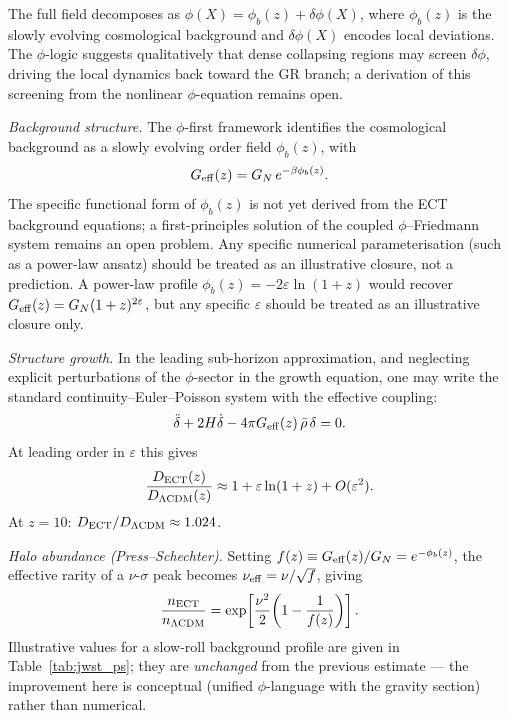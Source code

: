 \documentclass[11pt,a4paper]{article}
\numberwithin{equation}{section}
\begin{document}
The full field decomposes as $\phi(X)=\phi_b(z)+\delta\phi(X)$,
where $\phi_b(z)$ is the slowly evolving cosmological background
and $\delta\phi(X)$ encodes local deviations.
The $\phi$-logic suggests qualitatively that dense collapsing
regions may screen $\delta\phi$, driving the local dynamics back
toward the GR branch; a derivation of this screening from the
nonlinear $\phi$-equation remains open.

\textit{Background structure.}
The $\phi$-first framework identifies the cosmological background
as a slowly evolving order field $\phi_b(z)$, with
\begin{equation}
  G_{\rm eff}(z) = G_N\,e^{-\beta\phi_b(z)}.
  \label{eq:phi_b_ansatz}
\end{equation}
The specific functional form of $\phi_b(z)$ is not yet derived
from the ECT background equations; a first-principles solution
of the coupled $\phi$--Friedmann system remains an open problem.
Any specific numerical parameterisation (such as a power-law ansatz)
should be treated as an illustrative closure, not a prediction.
A power-law profile $\phi_b(z)=-2\varepsilon\ln(1+z)$ would recover
$G_{\rm eff}(z)=G_N(1+z)^{2\varepsilon}$, but any specific $\varepsilon$
should be treated as an illustrative closure only.

\textit{Structure growth.}
In the leading sub-horizon approximation, and neglecting explicit
perturbations of the $\phi$-sector in the growth equation, one may
write the standard continuity--Euler--Poisson system with the
effective coupling:
\begin{equation}
  \ddot\delta + 2H\dot\delta
  - 4\pi G_{\rm eff}(z)\,\bar\rho\,\delta = 0.
\end{equation}
At leading order in $\varepsilon$ this gives
\begin{equation}
  \frac{D_{\rm ECT}(z)}{D_{\Lambda{\rm CDM}}(z)}
  \approx 1 + \varepsilon\ln(1+z) + O(\varepsilon^2).
\end{equation}
At $z=10$: $D_{\rm ECT}/D_{\Lambda{\rm CDM}}\approx 1.024$.

\textit{Halo abundance (Press--Schechter).}
Setting $f(z)\equiv G_{\rm eff}(z)/G_N = e^{-\phi_b(z)}$,
the effective rarity of a $\nu$-$\sigma$ peak becomes
$\nu_{\rm eff}=\nu/\sqrt{f}$, giving
\begin{equation}
  \frac{n_{\rm ECT}}{n_{\Lambda{\rm CDM}}}
  = \exp\!\left[\frac{\nu^2}{2}\!\left(1-\frac{1}{f(z)}\right)\right].
  \label{eq:PS_phi}
\end{equation}
Illustrative values for a slow-roll background profile are given in
Table~\ref{tab:jwst_ps}; they are \emph{unchanged} from the
previous estimate --- the improvement here is conceptual
(unified $\phi$-language with the gravity section) rather than
numerical.
\end{document}

